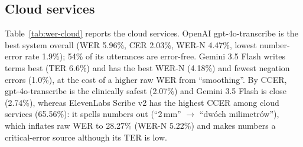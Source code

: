 \documentclass[conference]{IEEEtran}
\begin{document}
\subsection{Cloud services}
Table~\ref{tab:wer-cloud} reports the cloud services. OpenAI gpt-4o-transcribe is the best system overall (WER 5.96\%, CER 2.03\%, WER-N 4.47\%, lowest number-error rate 1.9\%); 54\% of its utterances are error-free. Gemini 3.5 Flash writes terms best (TER 6.6\%) and has the best WER-N (4.18\%) and fewest negation errors (1.0\%), at the cost of a higher raw WER from ``smoothing''. By CCER, gpt-4o-transcribe is the clinically safest (2.07\%) and Gemini 3.5 Flash is close (2.74\%), whereas ElevenLabs Scribe v2 has the highest CCER among cloud services (65.56\%): it spells numbers out (``2\,mm'' $\to$ ``dw\'och milimetr\'ow''), which inflates raw WER to 28.27\% (WER-N 5.22\%) and makes numbers a critical-error source although its TER is low.

\begin{table}[t]
\centering
\caption{Cloud services (online). Columns as in Table~\ref{tab:wer-open}; RTF includes network and queueing and is not comparable with local models.}
\label{tab:wer-cloud}
\end{table}
\end{document}
